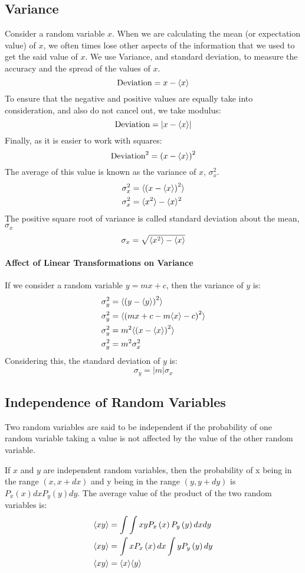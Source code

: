 \documentclass[12pt, oneside]{book}
\DeclarePairedDelimiter{\evdel}{\langle}{\rangle}
\newcommand{\ev}{\evdel}
\begin{document}
\subsection{Variance}
Consider a random variable \(x\).
When we are calculating the mean (or expectation value) of \(x\), we often times lose other aspects of the information that we used to get the said value of \(x\).
We use Variance, and standard deviation, to measure the accuracy and the spread of the values of \(x\).
\[ \text{Deviation} = x - \ev{x} \]
To ensure that the negative and positive values are equally take into consideration, and also do not cancel out, we take modulus:
\[ \text{Deviation} = \left|x - \ev{x}\right| \]
Finally, as it is easier to work with squares:
\[ \text{Deviation}^2 = \left(x - \ev{x}\right)^2 \]
The average of this value is known as the variance of \(x\), \(\sigma_x^2\).
\begin{align*}
    \sigma_x^2 &= \ev{\left(x - \ev{x}\right)^2} \\
    \sigma_x^2 &= \ev{x^2} - \ev{x}^2
\end{align*}
The positive square root of variance is called standard deviation about the mean, \(\sigma_x\)
\[ \sigma_x = \sqrt{\ev{x^2} - \ev{x}} \]

\paragraph{Affect of Linear Transformations on Variance}If we consider a random variable \(y = mx + c\), then the variance of \(y\) is:
\begin{align*}
    \sigma_y^2 &= \ev{\left(y - \ev{y}\right)^2} \\
    \sigma_y^2 &= \ev{\left(mx + c - m\ev{x} - c\right)^2} \\
    \sigma_y^2 &= m^2\ev{\left(x - \ev{x}\right)^2} \\
    \sigma_y^2 &= m^2\sigma_x^2
\end{align*}
Considering this, the standard deviation of \(y\) is:
\[ \sigma_y = \left|m\right|\sigma_x \]

\subsection{Independence of Random Variables}
Two random variables are said to be independent if the probability of one random variable taking a value is not affected by the value of the other random variable.

\noindent If \(x\) and \(y\) are independent random variables, then the probability of x being in the range \(\left(x, x+dx\right)\) and y being in the range \(\left(y, y+dy\right)\) is \(P_x \left(x\right) dx P_y \left(y\right) dy \).
The average value of the product of the two random variables is:
\begin{align*}
    \ev{xy} &= \int \int xy P_x \left(x\right) P_y \left(y\right) dx dy \\
    \ev{xy} &= \int x P_x \left(x\right) dx \int y P_y \left(y\right) dy \\
    \ev{xy} &= \ev{x} \ev{y}
\end{align*}
\end{document}
